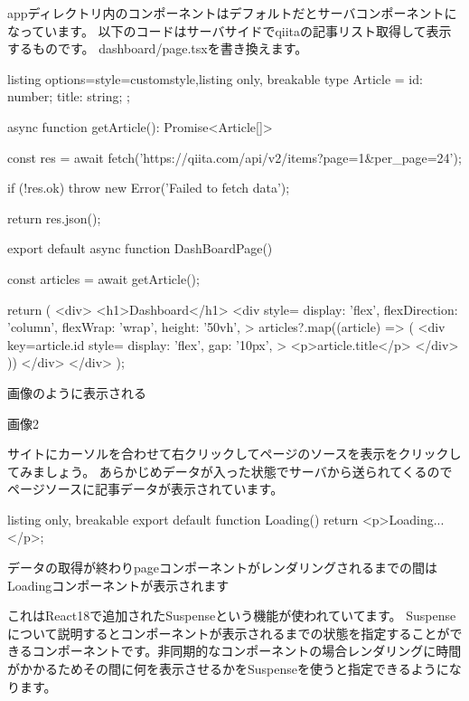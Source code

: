appディレクトリ内のコンポーネントはデフォルトだとサーバコンポーネントになっています。
以下のコードはサーバサイドでqiitaの記事リスト取得して表示するものです。
dashboard/page.tsxを書き換えます。



\begin{tcblisting}{listing options={style=customstyle},listing only, breakable}
  type Article = {
  id: number;
  title: string;
  };

  async function getArticle(): Promise<Article[]> {
  const res = await fetch('https://qiita.com/api/v2/items?page=1&per_page=24');

  if (!res.ok) {
      throw new Error('Failed to fetch data');
    }

  return res.json();
  }

  export default async function DashBoardPage() {
  const articles = await getArticle();

  return (
  <div>
  <h1>Dashboard</h1>
  <div
  style={{
      display: 'flex',
      flexDirection: 'column',
      flexWrap: 'wrap',
      height: '50vh',
    }}
  >
  {articles?.map((article) => (
  <div
  key={article.id}
  style={{
      display: 'flex',
      gap: '10px',
    }}
  >
    <p>{article.title}</p>
  </div>
  ))}
  </div>
  </div>
  );
  }


\end{tcblisting}






画像のように表示される

画像2


サイトにカーソルを合わせて右クリックしてページのソースを表示をクリックしてみましょう。
あらかじめデータが入った状態でサーバから送られてくるのでページソースに記事データが表示されています。


\begin{tcblisting}{listing only, breakable}
  export default function Loading() {
      return <p>Loading...</p>;
    }
\end{tcblisting}


データの取得が終わりpageコンポーネントがレンダリングされるまでの間はLoadingコンポーネントが表示されます




これはReact18で追加されたSuspenseという機能が使われていてます。
Suspenseについて説明するとコンポーネントが表示されるまでの状態を指定することができるコンポーネントです。非同期的なコンポーネントの場合レンダリングに時間がかかるためその間に何を表示させるかをSuspenseを使うと指定できるようになります。

